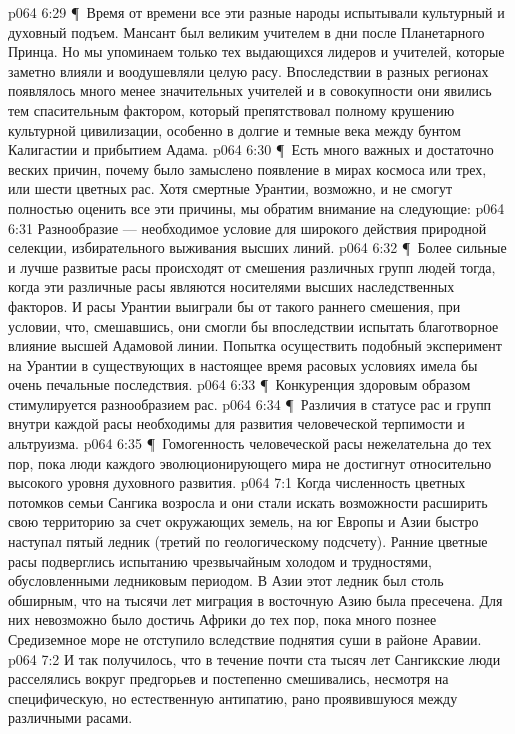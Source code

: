 \vs p064 6:29 \P\ Время от времени все эти разные народы испытывали культурный и духовный подъем. Мансант был великим учителем в дни после Планетарного Принца. Но мы упоминаем только тех выдающихся лидеров и учителей, которые заметно влияли и воодушевляли целую расу. Впоследствии в разных регионах появлялось много менее значительных учителей и в совокупности они явились тем спасительным фактором, который препятствовал полному крушению культурной цивилизации, особенно в долгие и темные века между бунтом Калигастии и прибытием Адама.
\vs p064 6:30 \P\ Есть много важных и достаточно веских причин, почему было замыслено появление в мирах космоса или трех, или шести цветных рас. Хотя смертные Урантии, возможно, и не смогут полностью оценить все эти причины, мы обратим внимание на следующие:
\vs p064 6:31 \bibnobreakspace Разнообразие --- необходимое условие для широкого действия природной селекции, избирательного выживания высших линий.
\vs p064 6:32 \P\ \bibnobreakspace Более сильные и лучше развитые расы происходят от смешения различных групп людей тогда, когда эти различные расы являются носителями высших наследственных факторов. И расы Урантии выиграли бы от такого раннего смешения, при условии, что, смешавшись, они смогли бы впоследствии испытать благотворное влияние высшей Адамовой линии. Попытка осуществить подобный эксперимент на Урантии в существующих в настоящее время расовых условиях имела бы очень печальные последствия.
\vs p064 6:33 \P\ \bibnobreakspace Конкуренция здоровым образом стимулируется разнообразием рас.
\vs p064 6:34 \P\ \bibnobreakspace Различия в статусе рас и групп внутри каждой расы необходимы для развития человеческой терпимости и альтруизма.
\vs p064 6:35 \P\ \bibnobreakspace Гомогенность человеческой расы нежелательна до тех пор, пока люди каждого эволюционирующего мира не достигнут относительно высокого уровня духовного развития.
\vs p064 7:1 Когда численность цветных потомков семьи Сангика возросла и они стали искать возможности расширить свою территорию за счет окружающих земель, на юг Европы и Азии быстро наступал пятый ледник (третий по геологическому подсчету). Ранние цветные расы подверглись испытанию чрезвычайным холодом и трудностями, обусловленными ледниковым периодом. В Азии этот ледник был столь обширным, что на тысячи лет миграция в восточную Азию была пресечена. Для них невозможно было достичь Африки до тех пор, пока много познее Средиземное море не отступило вследствие поднятия суши в районе Аравии.
\vs p064 7:2 И так получилось, что в течение почти ста тысяч лет Сангикские люди расселялись вокруг предгорьев и постепенно смешивались, несмотря на специфическую, но естественную антипатию, рано проявившуюся между различными расами.
